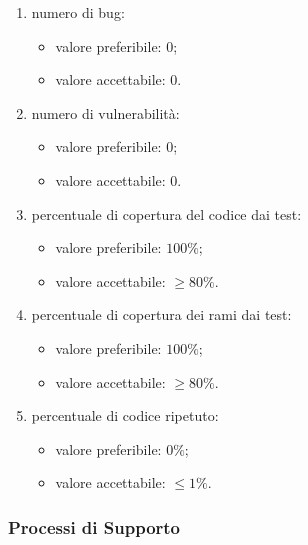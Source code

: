                 \begin{enumerate}
                    \item numero di bug:
                    \begin{itemize}
                        \item valore preferibile: $0$;
                        \item valore accettabile: $0$.
                    \end{itemize}
                    \item numero di vulnerabilità:
                    \begin{itemize}
                        \item valore preferibile: $0$;
                        \item valore accettabile: $0$.
                    \end{itemize}
                    \item percentuale di copertura del codice dai test:
                    \begin{itemize}
                        \item valore preferibile: $100\%$;
                        \item valore accettabile: $\geq 80\%$.
                    \end{itemize}
                    \item percentuale di copertura dei rami dai test:
                    \begin{itemize}
                        \item valore preferibile: $100\%$;
                        \item valore accettabile: $\geq 80\%$.
                    \end{itemize}
                    \item percentuale di codice ripetuto:
                    \begin{itemize}
                        \item valore preferibile: $0\%$;
                        \item valore accettabile: $\leq 1\%$.
                    \end{itemize}
                \end{enumerate}
    \subsubsection{Processi di Supporto}
